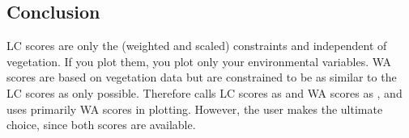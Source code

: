 \documentclass[article,nojss]{jss}
\begin{document}
\subsection{Conclusion}

LC scores are only the (weighted and scaled) constraints and
independent of vegetation. If you plot them, you plot only your
environmental variables. WA scores are based on vegetation data but
are constrained to be as similar to the LC scores as only
possible. Therefore  calls LC scores as
 and WA scores as , and uses
primarily WA scores in plotting.  However, the user makes the ultimate
choice, since both scores are available.


\end{document}
